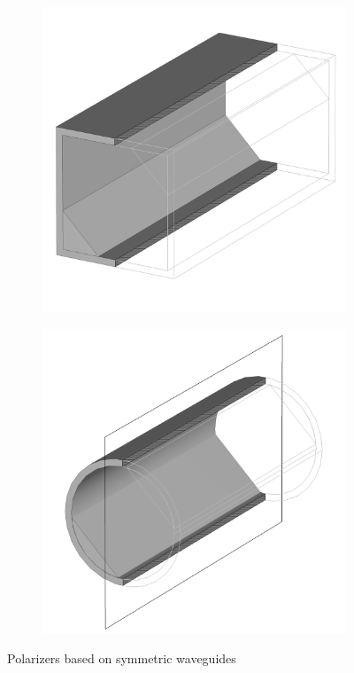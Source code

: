 \documentclass[11pt,a4paper,twoside,openany]{report}
\begin{document}
\begin{figure}[!ht]
    \centering
    \begin{subfigure}{.45\textwidth}
        \centering
        \includegraphics[width=\textwidth]{src/polarizer_square_perspective.png}
        \caption{\label{fig:polarizer-square-perspective}}
    \end{subfigure}
    \hfill
    \begin{subfigure}{.45\textwidth}
        \centering
        \includegraphics[width=\textwidth]{src/polarizer_circular_perspective.png}
        \caption{\label{fig:polarizer-circular-perspective}}
    \end{subfigure}
    \caption{\label{fig:polarizers}Polarizers based on symmetric waveguides}
\end{figure}
\end{document}
